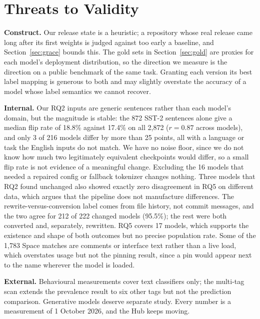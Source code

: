 \documentclass[conference]{IEEEtran}
\begin{document}
\section{Threats to Validity}\label{sec:threats}

\textbf{Construct.} Our release state is a heuristic; a repository whose real release came long after its first weights is judged against too early a baseline, and Section~\ref{sec:grace} bounds this. The gold sets in Section~\ref{sec:gold} are proxies for each model's deployment distribution, so the direction we measure is the direction on a public benchmark of the same task. Granting each version its best label mapping is generous to both and may slightly overstate the accuracy of a model whose label semantics we cannot recover.

\textbf{Internal.} Our RQ2 inputs are generic sentences rather than each model's domain, but the magnitude is stable: the 872 SST-2 sentences alone give a median flip rate of 18.8\% against 17.4\% on all 2,872 ($r = 0.87$ across models), and only 3 of 216 models differ by more than 25 points, all with a language or task the English inputs do not match. We have no noise floor, since we do not know how much two legitimately equivalent checkpoints would differ, so a small flip rate is not evidence of a meaningful change. Excluding the 16 models that needed a repaired config or fallback tokenizer changes nothing. Three models that RQ2 found unchanged also showed exactly zero disagreement in RQ5 on different data, which argues that the pipeline does not manufacture differences. The rewrite-versus-conversion label comes from file history, not commit messages, and the two agree for 212 of 222 changed models (95.5\%); the rest were both converted and, separately, rewritten. RQ5 covers 17 models, which supports the existence and shape of both outcomes but no precise population rate. Some of the 1,783 Space matches are comments or interface text rather than a live load, which overstates usage but not the pinning result, since a pin would appear next to the name wherever the model is loaded.

\textbf{External.} Behavioural measurements cover text classifiers only; the multi-tag scan extends the prevalence result to six other tags but not the prediction comparison. Generative models deserve separate study. Every number is a measurement of 1 October 2026, and the Hub keeps moving.
\end{document}
